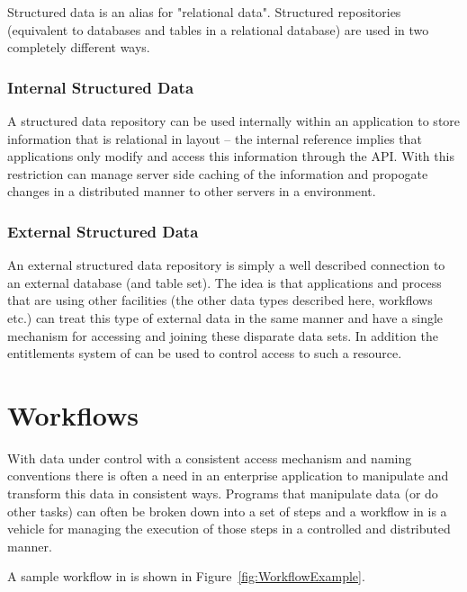 Structured data is an alias for "relational data". Structured repositories (equivalent to databases and tables in
a relational database) are used in two completely different ways.

\subsubsection{Internal Structured Data}

A structured data repository can be used internally within an application to store information that is relational in
layout -- the internal reference implies that applications only modify and access this information through the \Rapture API. With
this restriction \Rapture can manage server side caching of the information and propogate changes in a distributed manner to
other servers in a \Rapture environment.

\subsubsection{External Structured Data}

An external structured data repository is simply a well described connection to an external database (and table set). The idea
is that applications and process that are using other \Rapture facilities (the other data types described here, workflows etc.) can
treat this type of external data in the same manner and have a single mechanism for accessing and joining these disparate data sets. In addition
the entitlements system of \Rapture can be used to control access to such a resource.

\section{Workflows}

With data under control with a consistent access mechanism and naming conventions there is often a need in an enterprise application to
manipulate and transform this data in consistent ways. Programs that manipulate data (or do other tasks) can often be broken down into a set of steps
and a workflow in \Rapture is a vehicle for managing the execution of those steps in a controlled and distributed manner.

A sample workflow in \Rapture is shown in Figure~\vref{fig:WorkflowExample}.

